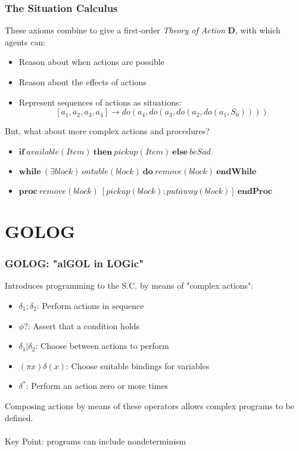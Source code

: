 \documentclass{beamer}
\begin{document}
\begin{frame}
\frametitle{The Situation Calculus}
These axioms combine to give a first-order \emph{Theory of Action} $\mathbf{D}$,
 with which agents can:
\begin{itemize}
  \item Reason about when actions are possible
  \item Reason about the effects of actions
  \item Represent sequences of actions as situations:\[
\left[a_1, a_2, a_3, a_4\right] \rightarrow do(a_4,do(a_3,do(a_2,do(a_1,S_0))))
\]
\end{itemize}
\pause
But, what about more complex actions and procedures?
\begin{itemize}
  \item $\mathbf{if}\ available(Item)\ \mathbf{then}\ pickup(Item)\ \mathbf{else}\ beSad$
  \item $\mathbf{while}\ (\exists block)\ ontable(block)\ \mathbf{do}\ remove(block)\ \mathbf{endWhile}$
  \item $\mathbf{proc}\ remove(block)\ [pickup(block);putaway(block)]\ \mathbf{endProc}$
\end{itemize}
\end{frame}

\section{GOLOG}
\begin{frame}
\frametitle{GOLOG: "alGOL in LOGic"}
Introduces programming to the S.C. by means of "complex actions":
\begin{itemize}
  \pause
  \item $\delta_1;\delta_2$: Perform actions in sequence
  \pause
  \item $\phi?$: Assert that a condition holds
  \pause
  \item $\delta_1|\delta_2$: Choose between actions to perform
  \pause
  \item $(\pi x)\delta(x)$: Choose suitable bindings for variables
  \pause
  \item $\delta^*$: Perform an action zero or more times
  \pause
\end{itemize}
Composing actions by means of these operators allows complex programs
to be defined.\\
\ \\
\pause
Key Point:  programs can include \alert{nondeterminism}
\end{frame}
\end{document}
